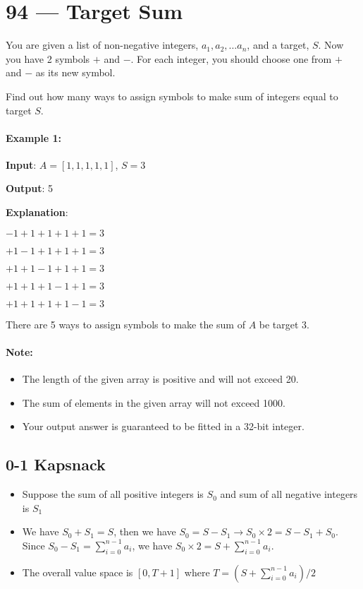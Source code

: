 \section{94 --- Target Sum}
You are given a list of non-negative integers, $a_1, a_2, \ldots a_n$, and a target, $S$. Now you have 2 symbols $+$ and $-$. For each integer, you should choose one from $+$ and $-$ as its new symbol.

Find out how many ways to assign symbols to make sum of integers equal to target $S$.

\paragraph{Example 1:}

\begin{flushleft}
\textbf{Input}: $A = [1, 1, 1, 1, 1]$, $S = 3$
 
\textbf{Output}: 5

\textbf{Explanation}: 

$-1+1+1+1+1 = 3$

$+1-1+1+1+1 = 3$

$+1+1-1+1+1 = 3$

$+1+1+1-1+1 = 3$

$+1+1+1+1-1 = 3$


\end{flushleft}

There are 5 ways to assign symbols to make the sum of $A$ be target 3.

\paragraph{Note:}
\begin{itemize}
\item The length of the given array is positive and will not exceed 20.
\item The sum of elements in the given array will not exceed 1000.
\item Your output answer is guaranteed to be fitted in a 32-bit integer.
\end{itemize}

\subsection{0-1 Kapsnack}
\begin{itemize}
\item Suppose the sum of all positive integers is $S_0$ and sum of all negative integers is $S_1$
\item We have $S_0 + S_1=S$, then we have $S_0 = S- S_1 \to S_0 \times 2 = S - S_1+S_0$. Since $S_0-S_1=\sum\limits_{i=0}^{n-1}a_i$, we have $S_0\times 2 = S + \sum\limits_{i=0}^{n-1}a_i$.
\item The overall value space is $[0, T+1]$ where $T = (S+\sum\limits_{i=0}^{n-1}a_i) / 2$
\end{itemize}

